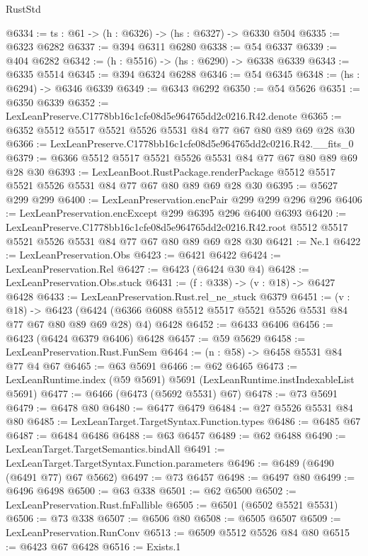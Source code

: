 \begin{lexlean}{RustStd}
\begin{coremodule}
@6334 := {ts : @61} -> (h : @6326) -> (hs : @6327) -> @6330 @504
@6335 := @6323 @6282
@6337 := @394 @6311 @6280
@6338 := @54 @6337
@6339 := @404 @6282
@6342 := (h : @5516) -> (hs : @6290) -> @6338 @6339
@6343 := @6335 @5514
@6345 := @394 @6324 @6288
@6346 := @54 @6345
@6348 := (hs : @6294) -> @6346 @6339
@6349 := @6343 @6292
@6350 := @54 @5626
@6351 := @6350 @6339
@6352 := LexLeanPreserve.C1778bb16c1cfe08d5e964765dd2c0216.R42.denote
@6365 := @6352 @5512 @5517 @5521 @5526 @5531 @84 @77 @67 @80 @89 @69 @28 @30
@6366 := LexLeanPreserve.C1778bb16c1cfe08d5e964765dd2c0216.R42.__fits_0
@6379 := @6366 @5512 @5517 @5521 @5526 @5531 @84 @77 @67 @80 @89 @69 @28 @30
@6393 := LexLeanBoot.RustPackage.renderPackage
    @5512
    @5517
    @5521
    @5526
    @5531
    @84
    @77
    @67
    @80
    @89
    @69
    @28
    @30
@6395 := @5627 @299 @299
@6400 := LexLeanPreservation.encPair @299 @299 @296 @296
@6406 := LexLeanPreservation.encExcept @299 @6395 @296 @6400 @6393
@6420 := LexLeanPreserve.C1778bb16c1cfe08d5e964765dd2c0216.R42.root
    @5512
    @5517
    @5521
    @5526
    @5531
    @84
    @77
    @67
    @80
    @89
    @69
    @28
    @30
@6421 := Ne.{1}
@6422 := LexLeanPreservation.Obs
@6423 := @6421 @6422
@6424 := LexLeanPreservation.Rel
@6427 := @6423 (@6424 @30 @4)
@6428 := LexLeanPreservation.Obs.stuck
@6431 := (f : @338) -> (v : @18) -> @6427 @6428
@6433 := LexLeanPreservation.Rust.rel_ne_stuck @6379
@6451 := (v : @18) ->
  @6423 (@6424 (@6366 @6088 @5512 @5517 @5521 @5526 @5531 @84 @77 @67 @80 @89 @69 @28) @4) @6428
@6452 := @6433 @6406
@6456 := @6423 (@6424 @6379 @6406) @6428
@6457 := @59 @5629
@6458 := LexLeanPreservation.Rust.FunSem
@6464 := (n : @58) -> @6458 @5531 @84 @77 @4 @67
@6465 := @63 @5691
@6466 := @62 @6465
@6473 := LexLeanRuntime.index (@59 @5691) @5691 (LexLeanRuntime.instIndexableList @5691)
@6477 := @6466 (@6473 (@5692 @5531) @67)
@6478 := @73 @5691
@6479 := @6478 @80
@6480 := @6477 @6479
@6484 := @27 @5526 @5531 @84 @80
@6485 := LexLeanTarget.TargetSyntax.Function.types
@6486 := @6485 @67
@6487 := @6484 @6486
@6488 := @63 @6457
@6489 := @62 @6488
@6490 := LexLeanTarget.TargetSemantics.bindAll
@6491 := LexLeanTarget.TargetSyntax.Function.parameters
@6496 := @6489 (@6490 (@6491 @77) @67 @5662)
@6497 := @73 @6457
@6498 := @6497 @80
@6499 := @6496 @6498
@6500 := @63 @338
@6501 := @62 @6500
@6502 := LexLeanPreservation.Rust.fnFallible
@6505 := @6501 (@6502 @5521 @5531)
@6506 := @73 @338
@6507 := @6506 @80
@6508 := @6505 @6507
@6509 := LexLeanPreservation.RunConv
@6513 := @6509 @5512 @5526 @84 @80
@6515 := @6423 @67 @6428
@6516 := Exists.{1}

\end{coremodule}
\end{lexlean}
